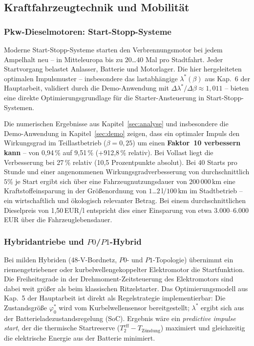 ﻿\documentclass[a4paper,12pt]{article}
\begin{document}
\subsection{Kraftfahrzeugtechnik und Mobilität}

\subsubsection{Pkw-Dieselmotoren: Start-Stopp-Systeme}

Moderne Start-Stopp-Systeme starten den Verbrennungsmotor bei jedem
Ampelhalt neu -- in Mitteleuropa bis zu $20$\ldots$40$ Mal pro Stadtfahrt.
Jeder Startvorgang belastet Anlasser, Batterie und Motorlager.
Die hier hergeleiteten optimalen Impulsmuster -- insbesondere das
lastabhängige $\lambda^*(\beta)$ aus Kap.~6 der Hauptarbeit, validiert
durch die Demo-Anwendung mit $\Delta\lambda^*/\Delta\beta \approx 1{,}011$
-- bieten eine direkte Optimierungsgrundlage für die Starter-Ansteuerung
in Start-Stopp-Systemen.

Die numerischen Ergebnisse aus Kapitel~\ref{sec:analyse} und insbesondere
die Demo-Anwendung in Kapitel~\ref{sec:demo} zeigen, dass ein optimaler
Impuls den Wirkungsgrad im Teillastbetrieb ($\beta = 0{,}25$) um einen
\textbf{Faktor~10 verbessern kann} -- von 0{,}94\,\% auf 9{,}51\,\%
(+912{,}8\,\% relativ). Bei Vollast liegt die Verbesserung bei 27\,\%
relativ (10{,}5 Prozentpunkte absolut). Bei $40$ Starts pro Stunde und
einer angenommenen Wirkungsgradverbesserung von durchschnittlich $5$\%
je Start ergibt sich über eine Fahrzeugnutzungsdauer von
$200\,000\,\text{km}$ eine Kraftstoffeinsparung in der Größenordnung von
$1$\ldots$2\,\text{l}/100\,\text{km}$ im Stadtbetrieb -- ein wirtschaftlich
und ökologisch relevanter Betrag. Bei einem durchschnittlichen Dieselpreis
von 1,50\,EUR/l entspricht dies einer Einsparung von etwa 3.000--6.000\,EUR
über die Fahrzeuglebensdauer.

\subsubsection{Hybridantriebe und $P0$/$P1$-Hybrid}

Bei milden Hybriden (48-V-Bordnetz, $P0$- und $P1$-Topologie) übernimmt
ein riemengetriebener oder kurbelwellengekoppelter Elektromotor
die Startfunktion. Die Freiheitsgrade in der Drehmoment-Zeitsteuerung
des Elektromotors sind dabei weit größer als beim klassischen Ritzelstarter.
Das Optimierungsmodell aus Kap.~5 der Hauptarbeit ist
direkt als Regelstrategie implementierbar: Die Zustandsgröße
$\varphi_0^*$ wird vom Kurbelwellensensor bereitgestellt;
$\lambda^*$ ergibt sich aus der Batterieladezustandsregelung (SoC).
Ergebnis wäre ein \textit{predictive impulse start}, der
die thermische Startreserve ($T_2^\text{eff} - T_\text{Zündung}$)
maximiert und gleichzeitig die elektrische Energie aus der Batterie
minimiert.
\end{document}
